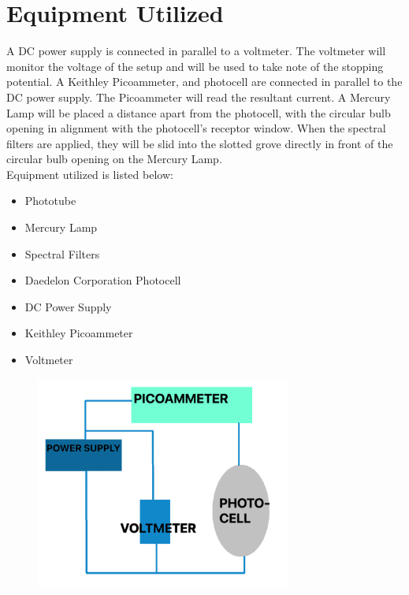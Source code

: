 \documentclass[a4paper]{article}
\begin{document}
\section{Equipment Utilized}

\qq A DC power supply is connected in parallel to a voltmeter. The
voltmeter will monitor the voltage of the setup and will be used to
take note of the stopping potential. A Keithley Picoammeter, and
photocell are connected in parallel to the DC power supply. The
Picoammeter will read the resultant current. A Mercury Lamp will be
placed a distance apart from the photocell, with the circular bulb
opening in alignment with the photocell's receptor window. When the
spectral filters are applied, they will be slid into the slotted grove
directly in front of the circular bulb opening on the Mercury Lamp. \\

Equipment utilized is listed below:

\begin{itemize}
\item Phototube 
\item Mercury Lamp 
\item Spectral Filters 
\item Daedelon Corporation Photocell 
\item DC Power Supply 
\item Keithley Picoammeter 
\item Voltmeter 
\end{itemize}

\begin{figure}[H]
\centering
\includegraphics[width=0.75\textwidth]{photo_circuit.png}
\label{photo_circuit}
\end{figure}
\end{document}
